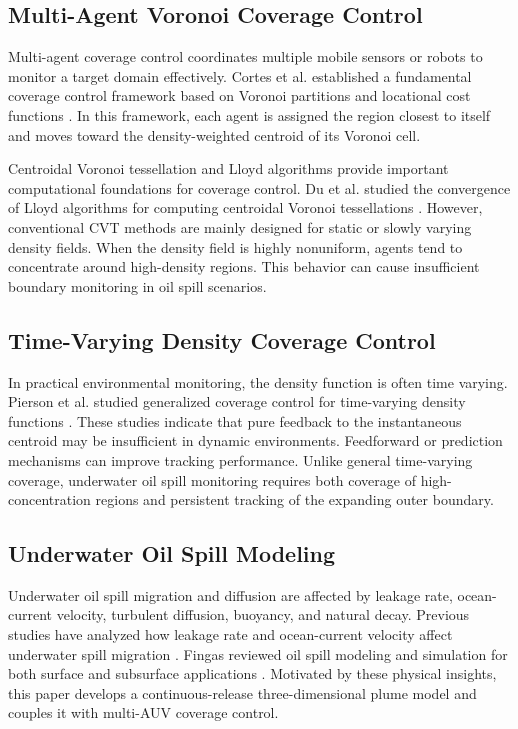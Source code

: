 \documentclass[conference]{IEEEtran}
\begin{document}
\subsection{Multi-Agent Voronoi Coverage Control}
Multi-agent coverage control coordinates multiple mobile sensors or robots to monitor a target domain effectively. Cortes et al. established a fundamental coverage control framework based on Voronoi partitions and locational cost functions \cite{cortes2004coverage}. In this framework, each agent is assigned the region closest to itself and moves toward the density-weighted centroid of its Voronoi cell.

Centroidal Voronoi tessellation and Lloyd algorithms provide important computational foundations for coverage control. Du et al. studied the convergence of Lloyd algorithms for computing centroidal Voronoi tessellations \cite{du2006lloyd}. However, conventional CVT methods are mainly designed for static or slowly varying density fields. When the density field is highly nonuniform, agents tend to concentrate around high-density regions. This behavior can cause insufficient boundary monitoring in oil spill scenarios.

\subsection{Time-Varying Density Coverage Control}
In practical environmental monitoring, the density function is often time varying. Pierson et al. studied generalized coverage control for time-varying density functions \cite{pierson2019generalized}. These studies indicate that pure feedback to the instantaneous centroid may be insufficient in dynamic environments. Feedforward or prediction mechanisms can improve tracking performance. Unlike general time-varying coverage, underwater oil spill monitoring requires both coverage of high-concentration regions and persistent tracking of the expanding outer boundary.

\subsection{Underwater Oil Spill Modeling}
Underwater oil spill migration and diffusion are affected by leakage rate, ocean-current velocity, turbulent diffusion, buoyancy, and natural decay. Previous studies have analyzed how leakage rate and ocean-current velocity affect underwater spill migration \cite{zhang2020oil}. Fingas reviewed oil spill modeling and simulation for both surface and subsurface applications \cite{fingas2022overview}. Motivated by these physical insights, this paper develops a continuous-release three-dimensional plume model and couples it with multi-AUV coverage control.
\end{document}
